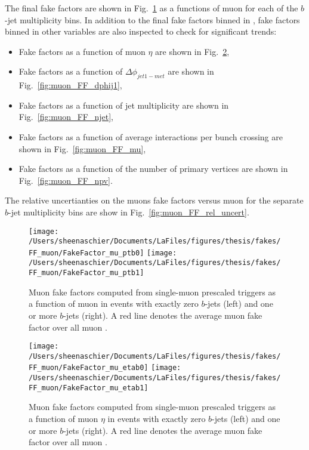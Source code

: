 The final fake factors are shown in Fig.~\ref{fig:muon_FF_hist} as a functions of muon \pt{} for each of the $b$-jet multiplicity bins.  In addition to the final fake factors binned in \pt, fake factors binned in other variables are also inspected to check for significant trends:
\begin{itemize}
\item Fake factors as a function of muon $\eta$ are shown in Fig.~\ref{fig:muon_FF_hist_eta},
\item Fake factors as a function of $\Delta\phi_{jet1-met}$ are shown in Fig.~\ref{fig:muon_FF_dphij1},
\item Fake factors as a function of jet multiplicity are shown in Fig.~\ref{fig:muon_FF_njet},
\item Fake factors as a function of average interactions per bunch crossing are shown in Fig.~\ref{fig:muon_FF_mu},
\item Fake factors as a function of the number of primary vertices are shown in Fig.~\ref{fig:muon_FF_npv}.
\end{itemize}
The relative uncertianties on the muons fake factors versus muon \pt{} for the separate $b$-jet multiplicity bins are show in Fig.~\ref{fig:muon_FF_rel_uncert}.

\begin{figure}[tbp]
  \centering
  \texttt{[image: /Users/sheenaschier/Documents/LaFiles/figures/thesis/fakes/FF\_muon/FakeFactor\_mu\_ptb0]}
  \texttt{[image: /Users/sheenaschier/Documents/LaFiles/figures/thesis/fakes/FF\_muon/FakeFactor\_mu\_ptb1]}\\
  \caption{Muon fake factors computed from single-muon prescaled triggers as a function of muon \pt{} in events with exactly zero $b$-jets (left) and one or more $b$-jets (right). A red line denotes the average muon fake factor over all muon \pt{}.}
  \label{fig:muon_FF_hist}
\end{figure}

\begin{figure}[tbp]
  \centering
  \texttt{[image: /Users/sheenaschier/Documents/LaFiles/figures/thesis/fakes/FF\_muon/FakeFactor\_mu\_etab0]}
  \texttt{[image: /Users/sheenaschier/Documents/LaFiles/figures/thesis/fakes/FF\_muon/FakeFactor\_mu\_etab1]}\\
  \caption{Muon fake factors computed from single-muon prescaled triggers as a function of muon $\eta$ in events with exactly zero $b$-jets (left) and one or more $b$-jets (right). A red line denotes the average muon fake factor over all muon \pt{}.}
  \label{fig:muon_FF_hist_eta}
\end{figure}

